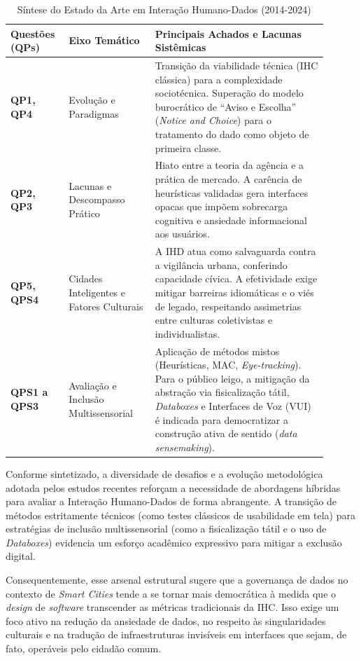 \documentclass[12pt]{article}
\begin{document}
\begin{table}[H]
\centering
\caption{Síntese do Estado da Arte em Interação Humano-Dados (2014-2024)}
\label{tab:sintese_geral}
\small
\begin{tabular}{p{0.15\linewidth} p{0.25\linewidth} p{0.50\linewidth}}
\hline
\textbf{Questões (QPs)} & \textbf{Eixo Temático} & \textbf{Principais Achados e Lacunas Sistêmicas} \\ \hline
\textbf{QP1, QP4} & Evolução e Paradigmas & Transição da viabilidade técnica (IHC clássica) para a complexidade sociotécnica. Superação do modelo burocrático de ``Aviso e Escolha'' (\textit{Notice and Choice}) para o tratamento do dado como objeto de primeira classe. \\ \hline
\textbf{QP2, QP3} & Lacunas e Descompasso Prático & Hiato entre a teoria da agência e a prática de mercado. A carência de heurísticas validadas gera interfaces opacas que impõem sobrecarga cognitiva e ansiedade informacional aos usuários. \\ \hline
\textbf{QP5, QPS4} & Cidades Inteligentes e Fatores Culturais & A IHD atua como salvaguarda contra a vigilância urbana, conferindo capacidade cívica. A efetividade exige mitigar barreiras idiomáticas e o viés de legado, respeitando assimetrias entre culturas coletivistas e individualistas. \\ \hline
\textbf{QPS1 a QPS3} & Avaliação e Inclusão Multissensorial & Aplicação de métodos mistos (Heurísticas, MAC, \textit{Eye-tracking}). Para o público leigo, a mitigação da abstração via fisicalização tátil, \textit{Databoxes} e Interfaces de Voz (VUI) é indicada para democratizar a construção ativa de sentido (\textit{data sensemaking}). \\ \hline
\end{tabular}
\end{table}

    Conforme sintetizado, a diversidade de desafios e a evolução metodológica adotada pelos estudos recentes reforçam a necessidade de abordagens híbridas para avaliar a Interação Humano-Dados de forma abrangente. A transição de métodos estritamente técnicos (como testes clássicos de usabilidade em tela) para estratégias de inclusão multissensorial (como a fisicalização tátil e o uso de \textit{Databoxes}) evidencia um esforço acadêmico expressivo para mitigar a exclusão digital. 

    Consequentemente, esse arsenal estrutural sugere que a governança de dados no contexto de \textit{Smart Cities} tende a se tornar mais democrática à medida que o \textit{design} de \textit{software} transcender as métricas tradicionais da IHC. Isso exige um foco ativo na redução da ansiedade de dados, no respeito às singularidades culturais e na tradução de infraestruturas invisíveis em interfaces que sejam, de fato, operáveis pelo cidadão comum.
\end{document}
